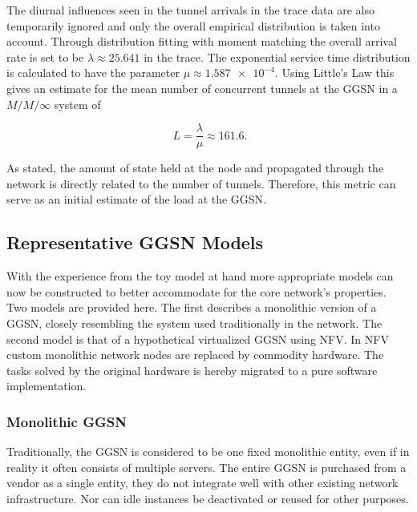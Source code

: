 The diurnal influences seen in the tunnel arrivals in the trace data are also temporarily ignored and only the overall empirical distribution is taken into account. Through distribution fitting with moment matching the overall arrival rate is set to be $\lambda\approx 25.641$ in the trace. The exponential service time distribution is calculated to have the parameter $\mu\approx \num{1.587e-4}$. Using Little's Law this gives an estimate for the mean number of concurrent tunnels at the \gls{GGSN} in a $M/M/\infty$ system of 

\begin{equation}
	\phantom{.}L=\frac{\lambda}{\mu}\approx 161.6\text{.} %
\end{equation}

As stated, the amount of state held at the node and propagated through the network is directly related to the number of tunnels. Therefore, this metric can serve as an initial estimate of the load at the \gls{GGSN}.


\subsection{Representative GGSN Models} 

With the experience from the toy model at hand more appropriate models can now be constructed to better accommodate for the core network's properties. Two models are provided here.
The first describes a monolithic version of a \gls{GGSN}, closely resembling the system used traditionally in the network. The second model is that of a hypothetical virtualized \gls{GGSN} using \gls{NFV}. In \gls{NFV}~\cite{nfv_whitepaper} custom monolithic network nodes are replaced by commodity hardware. The tasks solved by the original hardware is hereby migrated to a pure software implementation.


\subsubsection{Monolithic \texorpdfstring{\acrshort{GGSN}}{GGSN}}

Traditionally, the \gls{GGSN} is considered to be one fixed monolithic entity, even if in reality it often consists of multiple servers. The entire \gls{GGSN} is purchased from a vendor as a single entity, they do not integrate well with other existing network infrastructure. Nor can idle instances be deactivated or reused for other purposes.

